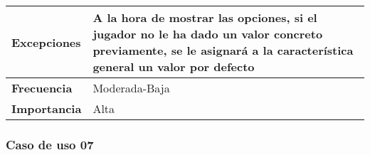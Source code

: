\begin{longtable}{l|l}
\begin{minipage}{0.25\columnwidth}
\textbf{Excepciones} 
\end{minipage}
&
\begin{minipage}{0.65\columnwidth}
A la hora de mostrar las opciones, si el jugador no le ha dado un valor concreto previamente, se le asignará  a la característica general un valor por defecto
\end{minipage}
\\ \hline

\begin{minipage}{0.25\columnwidth}
\textbf{Frecuencia} 
\end{minipage}
&
\begin{minipage}{0.65\columnwidth}
Moderada-Baja
\end{minipage}
\\ \hline

\begin{minipage}{0.25\columnwidth}
\textbf{Importancia} 
\end{minipage}
&
\begin{minipage}{0.65\columnwidth}
Alta
\end{minipage}
\\ \hline
\end{longtable}

\subsubsection{Caso de uso 07}

